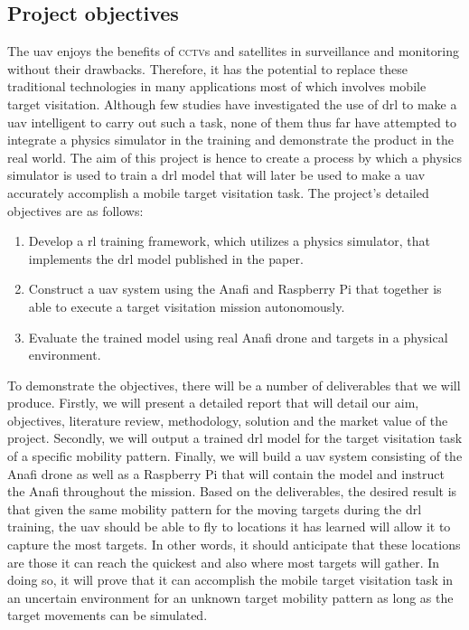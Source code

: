\documentclass[../main.tex]{subfiles}
\begin{document}

\subsection{Project objectives}

The \gls{uav} enjoys the benefits of \textsc{cctv}s and satellites
in surveillance and monitoring without their drawbacks.
Therefore, it has the potential to replace these
traditional technologies in many applications 
most of which involves mobile target visitation. 
Although few studies have investigated the use of \gls{drl}
to make a \gls{uav} intelligent to carry out such a task,
none of them thus far have attempted to
integrate a physics simulator in the training
and demonstrate the product in the real world.
The aim of this project is hence to create a process 
by which a physics simulator is used to train 
a \gls{drl} model that will later be used
to make a \gls{uav} accurately accomplish a
mobile target visitation task.
The project's detailed objectives are as follows:

\begin{enumerate}
    \item Develop a \gls{rl} training framework,
        which utilizes a physics simulator, 
        that implements the \gls{drl} model 
        published in the \textcite{Ged21} paper.
    \item Construct a \gls{uav} system using the Anafi and 
        Raspberry Pi that together is able to execute
        a target visitation mission autonomously.
    \item Evaluate the trained model using real Anafi drone
        and targets in a physical environment.
\end{enumerate}

To demonstrate the objectives, there will be a number 
of deliverables that we will produce.
Firstly, we will present a detailed report that will detail
our aim, objectives, literature review, methodology,
solution and the market value of the project.
Secondly, we will output a trained \gls{drl} model for 
the target visitation task of a specific
mobility pattern.
Finally, we will build a \gls{uav} system
consisting of the Anafi drone as well as a Raspberry Pi
that will contain the model and instruct
the Anafi throughout the mission.
Based on the deliverables, the desired result is that
given the same mobility pattern for 
the moving targets during the \gls{drl} training,
the \gls{uav} should be able to fly to locations it has learned
will allow it to capture the most targets. In other words,
it should anticipate that these locations are those it can reach
the quickest and also where most targets will gather.
In doing so, it will prove that it can accomplish 
the mobile target visitation task in an uncertain environment
for an unknown target mobility pattern
as long as the target movements can be simulated.
\end{document}
